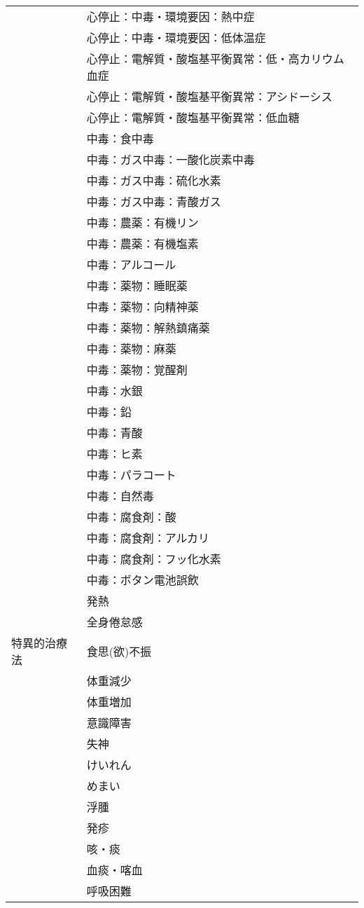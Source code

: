 \begin{xltabular}{\linewidth}{XX}
 & 心停止：中毒・環境要因：熱中症 \\
 & 心停止：中毒・環境要因：低体温症 \\
 & 心停止：電解質・酸塩基平衡異常：低・高カリウム血症 \\
 & 心停止：電解質・酸塩基平衡異常：アシドーシス \\
 & 心停止：電解質・酸塩基平衡異常：低血糖 \\
 & 中毒：食中毒 \\
 & 中毒：ガス中毒：一酸化炭素中毒 \\
 & 中毒：ガス中毒：硫化水素 \\
 & 中毒：ガス中毒：青酸ガス \\
 & 中毒：農薬：有機リン \\
 & 中毒：農薬：有機塩素 \\
 & 中毒：アルコール \\
 & 中毒：薬物：睡眠薬 \\
 & 中毒：薬物：向精神薬 \\
 & 中毒：薬物：解熱鎮痛薬 \\
 & 中毒：薬物：麻薬 \\
 & 中毒：薬物：覚醒剤 \\
 & 中毒：水銀 \\
 & 中毒：鉛 \\
 & 中毒：青酸 \\
 & 中毒：ヒ素 \\
 & 中毒：パラコート \\
 & 中毒：自然毒 \\
 & 中毒：腐食剤：酸 \\
 & 中毒：腐食剤：アルカリ \\
 & 中毒：腐食剤：フッ化水素 \\
 & 中毒：ボタン電池誤飲  \\
 & 発熱 \\
 & 全身倦怠感 \\
特異的治療法 & 食思(欲)不振 \\
 & 体重減少 \\
 & 体重増加 \\
 & 意識障害 \\
 & 失神 \\
 & けいれん \\
 & めまい \\
 & 浮腫 \\
 & 発疹 \\
 & 咳・痰 \\
 & 血痰・喀血 \\
 & 呼吸困難 \\

\end{xltabular}
